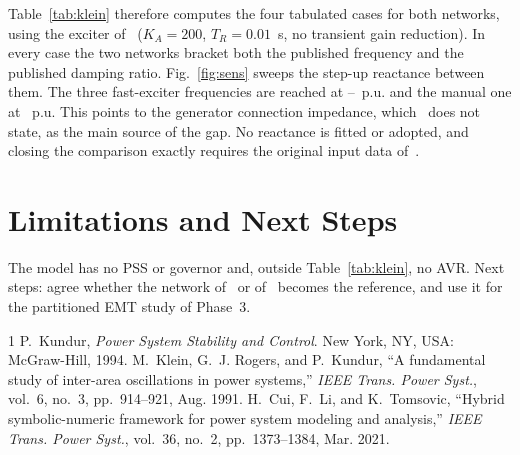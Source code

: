 \documentclass[conference,letterpaper]{IEEEtran}
\begin{document}
Table~\ref{tab:klein} therefore computes the four tabulated cases for both networks, using the exciter of~\cite[App.~A]{klein} ($K_A=200$, $T_R=0.01$~s, no transient gain reduction). In every case the two networks bracket both the published frequency and the published damping ratio. Fig.~\ref{fig:sens} sweeps the step-up reactance between them. The three fast-exciter frequencies are reached at \Vxtfastlo--\Vxtfasthi~p.u. and the manual one at \VxtM~p.u. This points to the generator connection impedance, which~\cite{klein} does not state, as the main source of the gap. No reactance is fitted or adopted, and closing the comparison exactly requires the original input data of~\cite{klein}.

\section{Limitations and Next Steps}
The model has no PSS or governor and, outside Table~\ref{tab:klein}, no AVR. Next steps: agree whether the network of~\cite{kundur} or of~\cite{klein} becomes the reference, and use it for the partitioned EMT study of Phase~3.

\begin{thebibliography}{1}
 P.~Kundur, \emph{Power System Stability and Control}. New York, NY, USA: McGraw-Hill, 1994.
 M.~Klein, G.~J. Rogers, and P.~Kundur, ``A fundamental study of inter-area oscillations in power systems,'' \emph{IEEE Trans. Power Syst.}, vol.~6, no.~3, pp.~914--921, Aug. 1991.
 H.~Cui, F.~Li, and K.~Tomsovic, ``Hybrid symbolic-numeric framework for power system modeling and analysis,'' \emph{IEEE Trans. Power Syst.}, vol.~36, no.~2, pp.~1373--1384, Mar. 2021.
\end{thebibliography}
\end{document}
